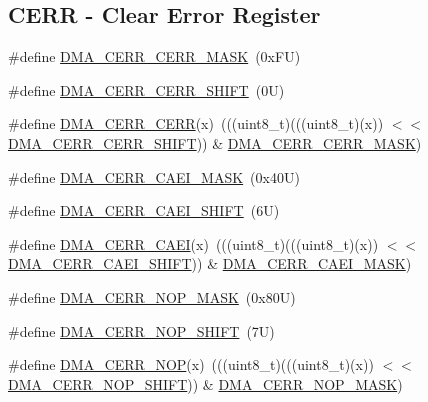 \subsection*{C\+E\+RR -\/ Clear Error Register}
\begin{DoxyCompactItemize}
\item 
\#define \mbox{\hyperlink{group___d_m_a___register___masks_ga291fce290f4fce77f31d4f210781a5cc}{D\+M\+A\+\_\+\+C\+E\+R\+R\+\_\+\+C\+E\+R\+R\+\_\+\+M\+A\+SK}}~(0x\+F\+U)
\item 
\#define \mbox{\hyperlink{group___d_m_a___register___masks_ga3aed793831e2681ef8989bbe67ffaa17}{D\+M\+A\+\_\+\+C\+E\+R\+R\+\_\+\+C\+E\+R\+R\+\_\+\+S\+H\+I\+FT}}~(0\+U)
\item 
\#define \mbox{\hyperlink{group___d_m_a___register___masks_ga8b912d2bceaf84a23183c7e93a862b1f}{D\+M\+A\+\_\+\+C\+E\+R\+R\+\_\+\+C\+E\+RR}}(x)~(((uint8\+\_\+t)(((uint8\+\_\+t)(x)) $<$$<$ \mbox{\hyperlink{group___d_m_a___register___masks_ga3aed793831e2681ef8989bbe67ffaa17}{D\+M\+A\+\_\+\+C\+E\+R\+R\+\_\+\+C\+E\+R\+R\+\_\+\+S\+H\+I\+FT}})) \& \mbox{\hyperlink{group___d_m_a___register___masks_ga291fce290f4fce77f31d4f210781a5cc}{D\+M\+A\+\_\+\+C\+E\+R\+R\+\_\+\+C\+E\+R\+R\+\_\+\+M\+A\+SK}})
\item 
\#define \mbox{\hyperlink{group___d_m_a___register___masks_ga7998031f3e0e7906d352da54eb92a1a8}{D\+M\+A\+\_\+\+C\+E\+R\+R\+\_\+\+C\+A\+E\+I\+\_\+\+M\+A\+SK}}~(0x40\+U)
\item 
\#define \mbox{\hyperlink{group___d_m_a___register___masks_ga04db9fa5c262642ad17f27d1cad24fba}{D\+M\+A\+\_\+\+C\+E\+R\+R\+\_\+\+C\+A\+E\+I\+\_\+\+S\+H\+I\+FT}}~(6\+U)
\item 
\#define \mbox{\hyperlink{group___d_m_a___register___masks_gadac363dc55d992510952d63726cfa7d3}{D\+M\+A\+\_\+\+C\+E\+R\+R\+\_\+\+C\+A\+EI}}(x)~(((uint8\+\_\+t)(((uint8\+\_\+t)(x)) $<$$<$ \mbox{\hyperlink{group___d_m_a___register___masks_ga04db9fa5c262642ad17f27d1cad24fba}{D\+M\+A\+\_\+\+C\+E\+R\+R\+\_\+\+C\+A\+E\+I\+\_\+\+S\+H\+I\+FT}})) \& \mbox{\hyperlink{group___d_m_a___register___masks_ga7998031f3e0e7906d352da54eb92a1a8}{D\+M\+A\+\_\+\+C\+E\+R\+R\+\_\+\+C\+A\+E\+I\+\_\+\+M\+A\+SK}})
\item 
\#define \mbox{\hyperlink{group___d_m_a___register___masks_gac284972d1fac094dd241e268d7a0ee17}{D\+M\+A\+\_\+\+C\+E\+R\+R\+\_\+\+N\+O\+P\+\_\+\+M\+A\+SK}}~(0x80\+U)
\item 
\#define \mbox{\hyperlink{group___d_m_a___register___masks_ga06ff2ec2da47380a89fcd01777bbe400}{D\+M\+A\+\_\+\+C\+E\+R\+R\+\_\+\+N\+O\+P\+\_\+\+S\+H\+I\+FT}}~(7\+U)
\item 
\#define \mbox{\hyperlink{group___d_m_a___register___masks_ga62536035145049195663fe6208d9a4a5}{D\+M\+A\+\_\+\+C\+E\+R\+R\+\_\+\+N\+OP}}(x)~(((uint8\+\_\+t)(((uint8\+\_\+t)(x)) $<$$<$ \mbox{\hyperlink{group___d_m_a___register___masks_ga06ff2ec2da47380a89fcd01777bbe400}{D\+M\+A\+\_\+\+C\+E\+R\+R\+\_\+\+N\+O\+P\+\_\+\+S\+H\+I\+FT}})) \& \mbox{\hyperlink{group___d_m_a___register___masks_gac284972d1fac094dd241e268d7a0ee17}{D\+M\+A\+\_\+\+C\+E\+R\+R\+\_\+\+N\+O\+P\+\_\+\+M\+A\+SK}})
\end{DoxyCompactItemize}
